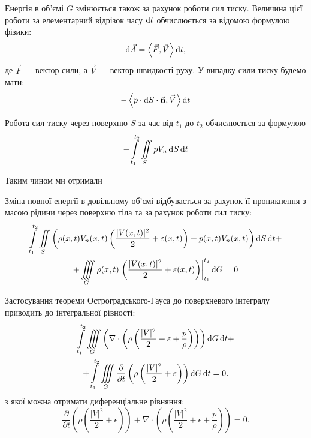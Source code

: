 Енергія в об'ємі $G$ змінюється також за рахунок роботи сил тиску. Величина цієї роботи за елементарний відрізок часу $\mathop{}\!\mathrm{d} t$ обчислюється за відомою формулою фізики:
\begin{equation}
	\diff \vec A = \langle \vec F, \vec V \rangle \diff t,
\end{equation}
де $\vec F$ --- вектор сили, а $\vec V$ --- вектор швидкості руху. У випадку сили тиску будемо мати:
\begin{equation}
	- \langle p \cdot \diff S \cdot \vec{\bf{n}}, \vec V \rangle \diff t
\end{equation}

Робота сил тиску через поверхню $S$ за час від $t_1$ до $t_2$ обчислюється за формулою
\begin{equation}
	- \displaystyle\int\limits_{t_1}^{t_2} \displaystyle\iint\limits_S  p  V_n \mathop{}\!\mathrm{d} S \mathop{}\!\mathrm{d} t
\end{equation}

Таким чином ми отримали
\begin{law}
	Зміна повної енергії в довільному об'ємі відбувається за рахунок її проникнення з масою рідини через поверхню тіла та за рахунок роботи сил тиску:
	\begin{multline}
		\displaystyle\int\limits_{t_1}^{t_2} \displaystyle\iint\limits_S \left( \rho(x, t) V_n(x, t) \left( \frac{|V(x, t)|^2}{2} + \varepsilon(x, t) \right) + p(x, t) V_n(x, t) \right) \mathop{}\!\mathrm{d} S \mathop{}\!\mathrm{d} t + \\
		+ \displaystyle\iiint\limits_G \rho(x, t) \left. \left( \frac{|V(x, t)|^2}{2} + \varepsilon(x, t) \right) \right|_{t_1}^{t_2} \mathop{}\!\mathrm{d} G = 0
	\end{multline}
\end{law}

Застосування теореми Остроградського-Гауса до поверхневого інтегралу приводить до інтегральної рівності:
\begin{multline}
	\displaystyle\int\limits_{t_1}^{t_2} \displaystyle\iiint\limits_G \left(\nabla \cdot \left( \rho \left( \frac{|V|^2}{2} + \varepsilon + \frac{p}{\rho} \right) \right)\right) \mathop{}\!\mathrm{d} G \mathop{}\!\mathrm{d} t + \\
	+ \displaystyle\int\limits_{t_1}^{t_2} \displaystyle\iiint\limits_G \frac{\partial}{\partial t} \left( \rho \left( \frac{|V|^2}{2} + \varepsilon \right) \right) \mathop{}\!\mathrm{d} G \mathop{}\!\mathrm{d} t = 0.
\end{multline}
з якої можна отримати диференціальне рівняння:
\begin{equation}
	\frac{\partial}{\partial t} \left( \rho \left( \frac{|V|^2}{2} + \epsilon \right) \right) +\nabla \cdot \left( \rho \left( \frac{|V|^2}{2} + \epsilon + \frac{p}{\rho} \right) \right) = 0.
\end{equation}

